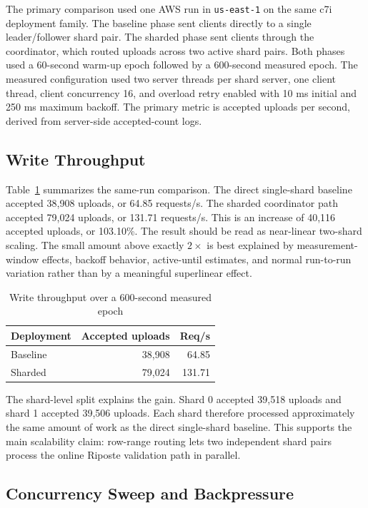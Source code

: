 \documentclass[conference]{IEEEtran}
\begin{document}
The primary comparison used one AWS run in \texttt{us-east-1} on the same c7i deployment family. The baseline phase sent clients directly to a single leader/follower shard pair. The sharded phase sent clients through the coordinator, which routed uploads across two active shard pairs. Both phases used a 60-second warm-up epoch followed by a 600-second measured epoch. The measured configuration used two server threads per shard server, one client thread, client concurrency 16, and overload retry enabled with 10 ms initial and 250 ms maximum backoff. The primary metric is accepted uploads per second, derived from server-side accepted-count logs.

\subsection{Write Throughput}

Table~\ref{tab:write-throughput} summarizes the same-run comparison. The direct single-shard baseline accepted 38,908 uploads, or 64.85 requests/s. The sharded coordinator path accepted 79,024 uploads, or 131.71 requests/s. This is an increase of 40,116 accepted uploads, or 103.10\%. The result should be read as near-linear two-shard scaling. The small amount above exactly \(2\times\) is best explained by measurement-window effects, backoff behavior, active-until estimates, and normal run-to-run variation rather than by a meaningful superlinear effect.

\begin{table}[!t]
\centering
\caption{Write throughput over a 600-second measured epoch}
\label{tab:write-throughput}
\small
\begin{tabular}{l r r}
\hline
\textbf{Deployment} & \textbf{Accepted uploads} & \textbf{Req/s} \\
\hline
Baseline & 38,908 & 64.85 \\
Sharded & 79,024 & 131.71 \\
\hline
\end{tabular}
\end{table}

The shard-level split explains the gain. Shard 0 accepted 39,518 uploads and shard 1 accepted 39,506 uploads. Each shard therefore processed approximately the same amount of work as the direct single-shard baseline. This supports the main scalability claim: row-range routing lets two independent shard pairs process the online Riposte validation path in parallel.

\subsection{Concurrency Sweep and Backpressure}
\end{document}
